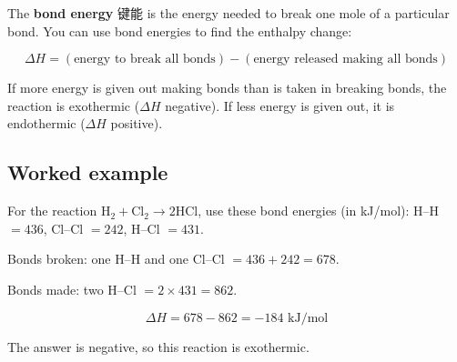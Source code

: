 \documentclass[11pt]{article}
\begin{document}
The \textbf{bond energy} 键能 is the energy needed to break one mole of a particular bond. You can use bond energies to find the enthalpy change:

\[
\Delta H = (\text{energy to break all bonds}) - (\text{energy released making all bonds})
\]

If more energy is given out making bonds than is taken in breaking bonds, the reaction is exothermic ($\Delta H$ negative). If less energy is given out, it is endothermic ($\Delta H$ positive).

\subsection*{Worked example}

For the reaction $\text{H}_2 + \text{Cl}_2 \rightarrow 2\text{HCl}$, use these bond energies (in kJ/mol): H–H $= 436$, Cl–Cl $= 242$, H–Cl $= 431$.

Bonds broken: one H–H and one Cl–Cl $= 436 + 242 = 678$.

Bonds made: two H–Cl $= 2 \times 431 = 862$.

\[
\Delta H = 678 - 862 = -184 \text{ kJ/mol}
\]

The answer is negative, so this reaction is exothermic.
\end{document}
